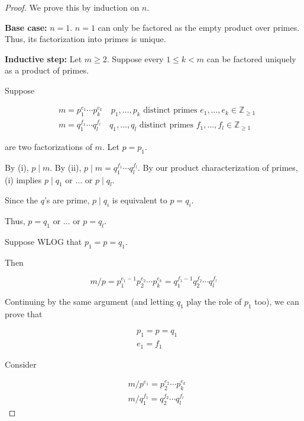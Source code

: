 \documentclass[11pt, draft]{article}
\begin{document}
\begin{proof}
    We prove this by induction on \(n\).

    \textbf{Base case:} \(n = 1\). \(n = 1\) can only be factored as the empty product over primes. Thus, its factorization into primes is unique.

    \textbf{Inductive step:} Let \(m \geq 2\). Suppose every \(1 \leq k < m\) can be factored uniquely as a product of primes.

    Suppose

    \[
        \begin{aligned}
             & m = p_1^{e_1} \cdots p_k^{e_k} \quad p_1, \ldots, p_k \text{ distinct primes } e_1, \ldots, e_k \in \mathbb{Z}_{\geq 1} \\
             & m = q_1^{f_1} \cdots q_l^{f_l} \quad q_1, \ldots, q_l \text{ distinct primes } f_1, \ldots, f_l \in \mathbb{Z}_{\geq 1}
        \end{aligned}
    \]

    are two factorizations of \(m\). Let \(p = p_1\).

    By (i), \(p \mid m\). By (ii), \(p \mid m = q_1^{f_1} \cdots q_l^{f_l}\). By
    our product characterization of primes, (i) implies \(p \mid q_1\) or
    \(\ldots\) or \(p \mid q_l\).

    Since the \(q\)'s are prime, \(p \mid q_i\) is equivalent to \(p = q_i\).

    Thus, \(p = q_1\) or \(\ldots\) or \(p = q_l\).

    Suppose WLOG that \(p_1 = p = q_1\).

    Then

    \[
        m / p = p_1^{e_1 - 1} p_2^{e_2} \cdots p_k^{e_k} = q_1^{f_1 - 1} q_2^{f_2} \cdots q_l^{f_l}
    \]

    Continuing by the same argument (and letting \(q_1\) play the role of \(p_1\)
    too), we can prove that

    \[
        \begin{aligned}
             & p_1 = p = q_1 \\
             & e_1 = f_1
        \end{aligned}
    \]

    Consider

    \[
        \begin{aligned}
             & m / p^{e_1} = p_2^{e_2} \cdots p_k^{e_k}   \\
             & m / q_1^{f_1} = q_2^{f_2} \cdots q_l^{f_l}
        \end{aligned}
    \]


\end{proof}
\end{document}

